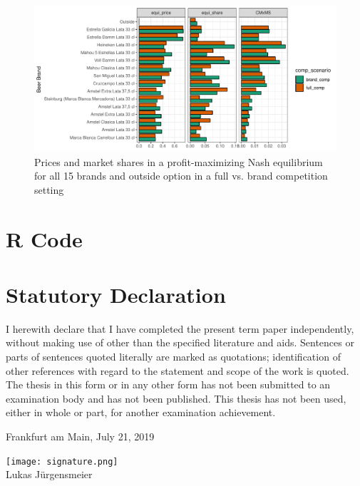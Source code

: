 \documentclass[12pt,a4paper]{article}
\begin{document}
\begin{figure}[ht]
	\centering
  \includegraphics[scale = 0.7]{figures/bar_price_share_full_brand_15.pdf}
	\caption{Prices and market shares in a profit-maximizing Nash equilibrium for all 15 brands and outside option in a full vs. brand competition setting}
	\label{fig_bar_fifteen}
\end{figure}
\clearpage


\section{R Code}






\clearpage



\newpage
\thispagestyle{empty}
\section*{Statutory Declaration}

I herewith declare that I have completed the present term paper independently, without making use of
other than the specified literature and aids. Sentences or parts of sentences quoted literally are
marked as quotations; identification of other references with regard to the statement and scope of
the work is quoted. The thesis in this form or in any other form has not been submitted to an examination body and has not been published.
This thesis has not been used, either in whole or part, for another examination achievement.

\vspace{1cm}

Frankfurt am Main, July 21, 2019

\texttt{[image: signature.png]}\\
Lukas J\"urgensmeier
\end{document}
